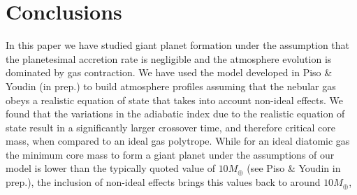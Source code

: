 \documentclass[apj]{emulateapj}
\begin{document}
%
%
%
%

%
%  
 \section{Conclusions}
 \label{conclusions}
 
 In this paper we have studied giant planet formation under the assumption that the planetesimal accretion rate is negligible and the atmosphere evolution is dominated by gas contraction. We have used the model developed in Piso \& Youdin (in prep.) to build atmosphere profiles assuming that the nebular gas obeys a realistic equation of state that takes into account non-ideal effects. We found that the variations in the adiabatic index due to the realistic equation of state result in a significantly larger crossover time, and therefore critical core mass, when compared to an ideal gas polytrope. While for an ideal diatomic gas the minimum core mass to form a giant planet under the assumptions of our model is lower than the typically quoted value of $10 M_{\oplus}$ (see Piso \& Youdin in prep.), the inclusion of non-ideal effects brings this values back to around $10 M_{\oplus}$,
 
\end{document}
